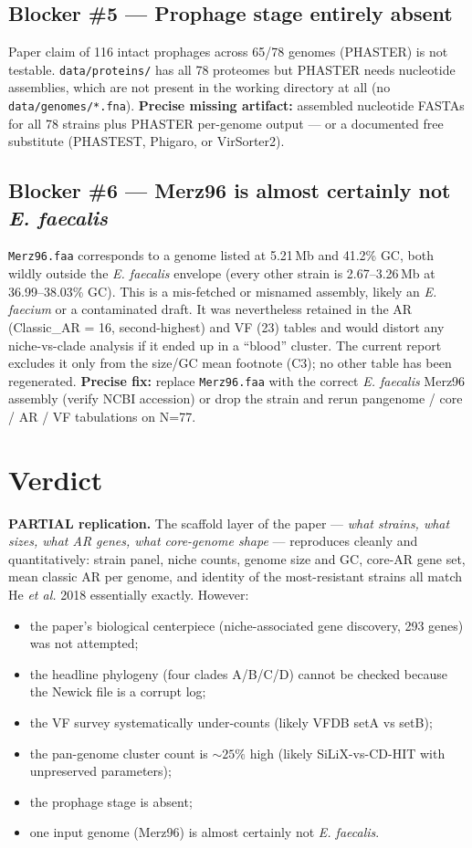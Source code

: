 \documentclass[11pt]{article}
\begin{document}
\subsection*{Blocker \#5 --- Prophage stage entirely absent}
Paper claim of 116 intact prophages across 65/78 genomes (PHASTER) is not testable. \texttt{data/proteins/} has all 78 proteomes but PHASTER needs nucleotide assemblies, which are not present in the working directory at all (no \texttt{data/genomes/*.fna}). \textbf{Precise missing artifact:} assembled nucleotide FASTAs for all 78 strains plus PHASTER per-genome output --- or a documented free substitute (PHASTEST, Phigaro, or VirSorter2).

\subsection*{Blocker \#6 --- Merz96 is almost certainly not \emph{E. faecalis}}
\texttt{Merz96.faa} corresponds to a genome listed at 5.21\,Mb and 41.2\% GC, both wildly outside the \emph{E. faecalis} envelope (every other strain is 2.67--3.26\,Mb at 36.99--38.03\% GC). This is a mis-fetched or misnamed assembly, likely an \emph{E. faecium} or a contaminated draft. It was nevertheless retained in the AR (Classic\_AR = 16, second-highest) and VF (23) tables and would distort any niche-vs-clade analysis if it ended up in a ``blood'' cluster. The current report excludes it only from the size/GC mean footnote (C3); no other table has been regenerated. \textbf{Precise fix:} replace \texttt{Merz96.faa} with the correct \emph{E. faecalis} Merz96 assembly (verify NCBI accession) or drop the strain and rerun pangenome / core / AR / VF tabulations on N=77.

\section{Verdict}
\textbf{PARTIAL replication.} The scaffold layer of the paper --- \emph{what strains, what sizes, what AR genes, what core-genome shape} --- reproduces cleanly and quantitatively: strain panel, niche counts, genome size and GC, core-AR gene set, mean classic AR per genome, and identity of the most-resistant strains all match He \emph{et al.} 2018 essentially exactly. However:
\begin{itemize}[leftmargin=1.3em, itemsep=1pt]
  \item the paper's biological centerpiece (niche-associated gene discovery, 293 genes) was not attempted;
  \item the headline phylogeny (four clades A/B/C/D) cannot be checked because the Newick file is a corrupt log;
  \item the VF survey systematically under-counts (likely VFDB setA vs setB);
  \item the pan-genome cluster count is $\sim 25\%$ high (likely SiLiX-vs-CD-HIT with unpreserved parameters);
  \item the prophage stage is absent;
  \item one input genome (Merz96) is almost certainly not \emph{E. faecalis}.
\end{itemize}
\end{document}
